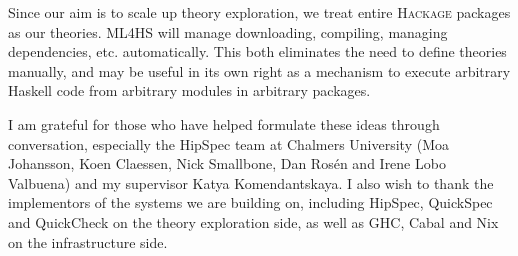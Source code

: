 \documentclass{eceasst}
\begin{document}
Since our aim is to scale up theory exploration, we treat entire
\textsc{Hackage} packages as our theories. \textsc{ML4HS} will manage
downloading, compiling, managing dependencies, etc. automatically. This
both eliminates the need to define theories manually, and may be useful
in its own right as a mechanism to execute arbitrary Haskell code from
arbitrary modules in arbitrary packages.

\begin{acknowledge}
I am grateful for those who have helped formulate these ideas through
conversation, especially the HipSpec team at Chalmers University (Moa
Johansson, Koen Claessen, Nick Smallbone, Dan Ros{\'e}n and Irene Lobo Valbuena)
and my supervisor Katya Komendantskaya. I also wish to thank the implementors
of the systems we are building on, including HipSpec, QuickSpec and
QuickCheck on the theory exploration side, as well as GHC, Cabal and Nix
on the infrastructure side.
\end{acknowledge}



\end{document}
